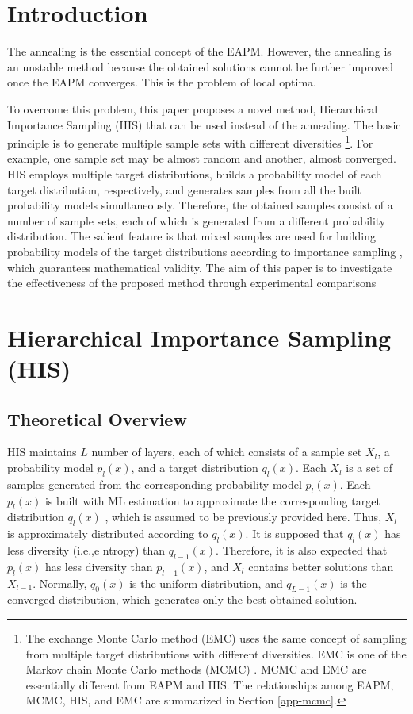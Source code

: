 \section{Introduction}
The annealing is the essential concept of the EAPM.
However, the annealing
is an unstable method
because the obtained solutions cannot be further improved
once the EAPM converges.
This is the problem of local optima.

To overcome this problem,
this paper proposes a novel method, Hierarchical Importance
Sampling (HIS) that can be used instead of the annealing.
The basic principle is to generate multiple sample sets
with different diversities
\footnote{
The exchange Monte Carlo method (EMC) \cite{hukushima:emc}
uses the same concept of sampling from
multiple target distributions with different diversities.
EMC is one of the Markov chain Monte Carlo methods (MCMC) \cite{bishop:ml}.
MCMC and EMC are essentially different from EAPM and HIS.
The relationships among EAPM, MCMC, HIS, and EMC are 
summarized in Section \ref{app-mcmc}.}.
For example, one sample set may be almost random and
another, almost converged.
HIS employs multiple target distributions,
builds a probability model of each target distribution, respectively,
and generates samples
from all the built probability models simultaneously.
Therefore, the obtained samples consist of a number of 
sample sets, each of which
is generated from a different probability distribution.
The salient feature is that
mixed samples are used for building probability models
of the target distributions according to 
importance sampling  \cite{bishop:ml,rubinstein:mc},
which guarantees mathematical validity.
The aim of this paper is to investigate the effectiveness of
the proposed method through experimental comparisons


\section{Hierarchical Importance Sampling (HIS)}

\subsection{Theoretical Overview}
HIS
 maintains $L$ number of layers, each of which 
consists of 
a sample set $X_l$, 
a probability model $p_l(x)$, 
and
a target distribution $q_l(x)$.
Each $X_l$ is
a set of samples generated from
the corresponding probability model $p_l(x)$.
Each $p_l(x)$ is built with ML estimation
to approximate the corresponding target distribution $q_l(x)$
, which is assumed to be previously provided here.
Thus, $X_l$ is approximately
distributed according to $q_l(x)$.
It is supposed that
$q_l(x)$ has less diversity (i.e.,e ntropy) than $q_{l-1}(x)$.
Therefore,
it is also expected that
$p_l(x)$ has less diversity than $p_{l-1}(x)$, and
$X_l$ contains better solutions than $X_{l-1}$.
Normally,  $q_0(x)$ is the uniform distribution,
and
$q_{L-1}(x)$ is the converged distribution,
which generates only the best obtained solution.

